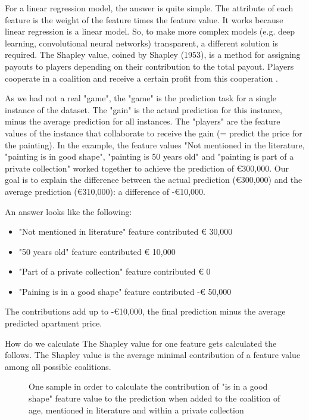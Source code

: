 For a linear regression model, the answer is quite simple. The attribute of each feature is the weight of the feature times the feature value. It works because linear regression is a linear model. So, to make more complex models (e.g. deep learning, convolutional neural networks) transparent, a different solution is required. The Shapley value, coined by Shapley (1953), is a method for assigning payouts to players depending on their contribution to the total payout. Players cooperate in a coalition and receive a certain profit from this cooperation \cite{aas2019explaining} \cite{Lundberg} \cite{ScottM}.

As we had not a real "game", the "game" is the prediction task for a single instance of the dataset. The "gain" is the actual prediction for this instance, minus the average prediction for all instances. The "players" are the feature values of the instance that collaborate to receive the gain (= predict the price for the painting). In the example, the feature values "Not mentioned in the literature, "painting is in good shape", "painting is 50 years old" and "painting is part of a private collection" worked together to achieve the prediction of €300,000. Our goal is to explain the difference between the actual prediction (€300,000) and the average prediction (€310,000): a difference of -€10,000.

An answer looks like the following:

\begin{itemize}
	\item "Not mentioned in literature" feature contributed  € 30,000
	\item "50 years old" feature contributed € 10,000
	\item "Part of a private collection" feature contributed € 0
	\item "Paining is in a good shape" feature contributed -€ 50,000
\end{itemize}

The contributions add up to -€10,000, the final prediction minus the average predicted apartment price.

How do we calculate The Shapley value for one feature gets calculated the follows. The Shapley value is the average minimal contribution of a feature value among all possible coalitions.\\

\begin{figure}[!htp]
	\centering
	\caption{One sample in order to calculate the contribution of "is in a good shape" feature value to the prediction when added to the coalition of age, mentioned in literature and within a private collection }
	\label{fig:shapley_values_example_01}
\end{figure}


